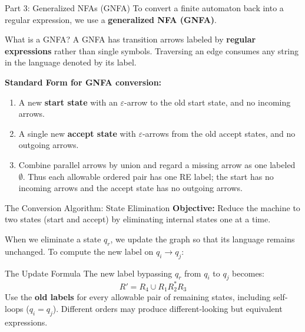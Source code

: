 \documentclass[10pt]{beamer}
\begin{document}
\begin{frame}{Part 3: Generalized NFAs (GNFA)}
  To convert a finite automaton back into a regular expression, we use a
  \textbf{generalized NFA (GNFA)}.
  \pause
  \begin{block}{What is a GNFA?}
    A GNFA has transition arrows labeled by \textbf{regular expressions}
    rather than single symbols. Traversing an edge consumes any string in the
    language denoted by its label.
  \end{block}
  \pause
  \textbf{Standard Form for GNFA conversion:}
  \begin{enumerate}
    \item A new \textbf{start state} with an $\varepsilon$-arrow to the old start state, and no incoming arrows.
    \item A single new \textbf{accept state} with $\varepsilon$-arrows from the old accept states, and no outgoing arrows.
    \item Combine parallel arrows by union and regard a missing arrow as one
      labeled $\emptyset$. Thus each allowable ordered pair has one RE label;
      the start has no incoming arrows and the accept state has no outgoing
      arrows.
  \end{enumerate}
\end{frame}

\begin{frame}{The Conversion Algorithm: State Elimination}
  \small
  \textbf{Objective:} Reduce the machine to two states (start and accept) by
  eliminating internal states one at a time.
  \pause

  When we eliminate a state $q_r$, we update the graph so that its language
  remains unchanged. To compute the new label on $q_i\rightarrow q_j$:
  \pause

  \begin{center}
  \end{center}
  \pause
  \begin{block}{The Update Formula}
    The new label bypassing $q_r$ from $q_i$ to $q_j$ becomes:
    \[ R' = R_4 \cup R_1R_2^*R_3 \]
    Use the \textbf{old labels} for every allowable pair of remaining states,
    including self-loops ($q_i=q_j$). Different orders may produce different-looking but
    equivalent expressions.
  \end{block}
\end{frame}
\end{document}
